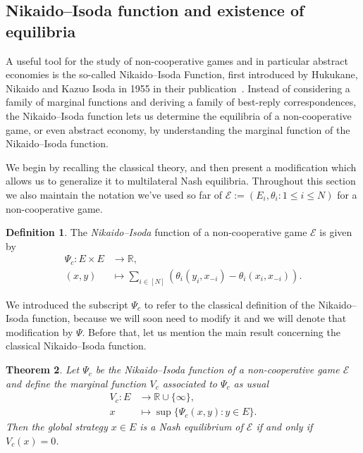 \documentclass[a4paper,11pt,reqno,english]{amsart}
\theoremstyle{plain}
\newtheorem{theorem}{Theorem}[section]
\theoremstyle{definition}
\newtheorem{definition}[theorem]{Definition}
\newcommand{\Ecal}{\mathcal{E}}
\begin{document}
\subsection{Nikaido--Isoda function and existence of equilibria}

A useful tool for the study of non-cooperative games and in particular abstract economies is the so-called Nikaido--Isoda Function, first introduced by Hukukane, Nikaido and Kazuo Isoda in 1955 in their publication~\cite{NikaidoIsoda1955}.
Instead of considering a family of marginal functions and deriving a family of best-reply correspondences, the Nikaido--Isoda function lets us determine the equilibria of a non-cooperative game, or even abstract economy, by understanding the marginal function of the Nikaido--Isoda function.

\medskip
We begin by recalling the classical theory, and then present a modification which allows us to generalize it to multilateral Nash equilibria.
Throughout this section we also maintain the notation we've used so far of $\Ecal:=(E_i,\theta_i: 1\leq i\leq N)$ for a non-cooperative game.

\begin{definition}\label{def:NikaidoIsodaClassical}
	The {\em Nikaido--Isoda} function of a non-cooperative game $\Ecal$ is given by
	\begin{align*}
		\Psi_c\colon E\times E & \longrightarrow \mathbb{R} ,                                                          \\
		(x,y)                  & \longmapsto \sum_{i\in[N]} \left(\theta_i(y_i,x_{-i}) - \theta_i(x_i, x_{-i})\right).
	\end{align*}
\end{definition}

We introduced the subscript $\Psi_c$ to refer to the classical definition of the Nikaido--Isoda function, because we will soon need to modify it and we will denote that modification by $\Psi$.
Before that, let us mention the main result concerning the classical Nikaido--Isoda function.

\begin{theorem}\label{thm:NikaidoIsodaClassicalTheorem}
	Let $\Psi_c$ be the Nikaido--Isoda function of a non-cooperative game $\Ecal$ and define the marginal function $V_c$ associated to $\Psi_c$ as usual
	\begin{align*}
		V_c\colon E & \longrightarrow \mathbb{R} \cup \{\infty\},       \\
		x           & \longmapsto \sup\big\{\Psi_c(x,y) : y\in E\big\}.
	\end{align*}
	Then the global strategy $x\in E$ is a Nash equilibrium of $\Ecal$ if and only if $V_c(x) = 0$.
\end{theorem}
\end{document}
